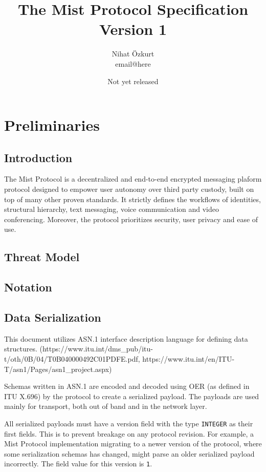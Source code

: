 \documentclass{article}
\title{The Mist Protocol Specification Version 1}
\author{Nihat Özkurt\\email@here}
\date{Not yet released}
\begin{document}
\maketitle

\newpage
{}
\tableofcontents

\newpage
{}

\section{Preliminaries}

\subsection{Introduction}
The Mist Protocol is a decentralized and end-to-end encrypted messaging plaform protocol designed to empower user autonomy over third party custody, built on top of many other proven standards. It strictly defines the workflows of identities, structural hierarchy, text messaging, voice communication and video conferencing. Moreover, the protocol prioritizes security, user privacy and ease of use.

\subsection{Threat Model}

\subsection{Notation}

\subsection{Data Serialization}
This document utilizes ASN.1 interface description language for defining data structures. (https://www.itu.int/dms\_pub/itu-t/oth/0B/04/T0B040000492C01PDFE.pdf, https://www.itu.int/en/ITU-T/asn1/Pages/asn1\_project.aspx)

Schemas written in ASN.1 are encoded and decoded using OER (as defined in ITU X.696) by the protocol to create a serialized payload. The payloads are used mainly for transport, both out of band and in the network layer.

All serialized payloads must have a version field with the type \verb|INTEGER| as their first fields. This is to prevent breakage on any protocol revision. For example, a Mist Protocol implementation migrating to a newer version of the protocol, where some serialization schemas has changed, might parse an older serialized payload incorrectly. The field value for this version is \verb|1|.
\end{document}
